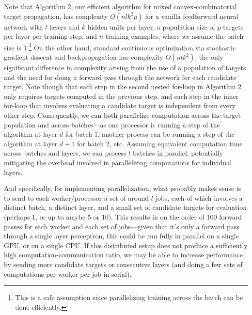 \documentclass[12pt,letterpaper]{article}
\begin{document}
Note that Algorithm 2, our efficient algorithm for mixed convex-combinatorial target propagation, has complexity $O(nlk^{2}p)$ for a vanilla feedforward neural network with $l$ layers and $k$ hidden units per layer, a population size of $p$ targets per layer per training step, and $n$ training examples, where we assume the batch size is 1.\footnote{This is a safe assumption since parallelizing training across the batch can be done efficiently.} On the other hand, standard continuous optimization via stochastic gradient descent and backpropagation has complexity $O(nlk^{2})$, the only significant difference in complexity arising from the use of a population of targets and the need for doing a forward pass through the network for each candidate target. Note though that each step in the second nested for-loop in Algorithm 2 only requires targets computed in the previous step, and each step in the inner for-loop that involves evaluating a candidate target is independent from every other step. Consequently, we can both parallelize computation across the target population and across batches---as one processor is running a step of the algorithm 
at layer $d$ for batch $1$, another process can be running a step of the algorithm at layer $d+1$ for batch $2$, etc. Assuming equivalent computation time across batches and layers, we can process $l$ batches in parallel, potentially mitigating the overhead involved in parallelizing computations for individual layers. 

And specifically, for implementing parallelization, what probably makes sense is to send to each worker/processor a set of around $l$ jobs, each of which involves a distinct batch, a distinct layer, and a small set of candidate targets for evaluation (perhaps 1, or up to maybe 5 or 10). This results in on the order of 100 forward passes for each worker and each set of jobs---given that it's only a forward pass through a single layer perceptron, this could be run fully in parallel on a single GPU, or on a single CPU. If this distributed setup does not produce a sufficiently high computation-communication ratio, we may be able to increase performance by sending more candidate targets or consecutive layers (and doing a few sets of computations per worker per job in serial).
\end{document}
